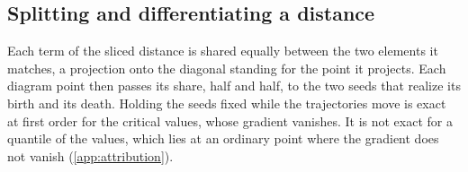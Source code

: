 \subsection{Splitting and differentiating a distance}

Each term of the sliced distance is shared equally between the two elements it matches, a projection onto the diagonal
standing for the point it projects. Each diagram point then passes its share, half and half, to the two seeds that
realize its birth and its death. Holding the seeds fixed while the trajectories move is exact at first order for the
critical values, whose gradient vanishes. It is not exact for a quantile of the values, which lies at an ordinary point
where the gradient does not vanish (\cref{app:attribution}).
